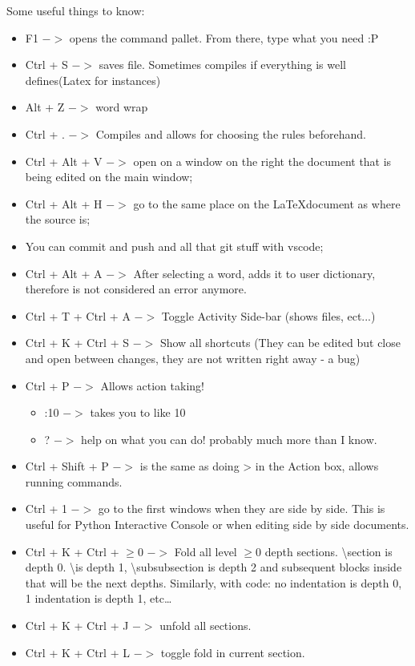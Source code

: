\par Some useful things to know:
\begin{itemize}
    \item F1 $->$ opens the command pallet. From there, type what you need :P
    \item Ctrl + S $->$ saves file. Sometimes compiles if everything is well defines(Latex for instances)
    \item Alt + Z $->$ word wrap
    \item Ctrl + . $->$ Compiles and allows for choosing the rules beforehand.
    \item Ctrl + Alt + V $->$ open on a window on the right the document that is being edited on the main window;
    \item Ctrl + Alt + H $->$ go to the same place on the \LaTeX document as where the source is;
    \item You can commit and push and all that git stuff with vscode;
    \item Ctrl + Alt + A $->$ After selecting a word, adds it to user dictionary, therefore is not considered an error anymore.
    \item Ctrl + T + Ctrl + A $->$ Toggle Activity Side-bar (shows files, ect...)
    \item Ctrl + K + Ctrl + S $->$ Show all shortcuts (They can be edited but close and open between changes, they are not written right away - a bug)
    \item Ctrl + P $->$ Allows action taking! 
        \begin{itemize}
            \item :10 $->$ takes you to like 10
            \item ? $->$ help on what you can do! probably much more than I know.
        \end{itemize}
    \item Ctrl + Shift + P $->$ is the same as doing > in the Action box, allows running commands.
    \item Ctrl + 1 $->$ go to the first windows when they are side by side. This is useful for Python Interactive Console or when editing side by side documents.
    \item Ctrl + K + Ctrl + $\geq 0$ $->$ Fold all level $\geq 0$ depth sections. \textbackslash section is depth 0. \textbackslash  is depth 1, \textbackslash subsubsection is depth 2 and subsequent blocks inside that will be the next depths. Similarly, with code: no indentation is depth 0, 1 indentation is depth 1, etc\dots
    \item Ctrl + K + Ctrl + J $->$ unfold all sections.
    \item Ctrl + K + Ctrl + L $->$ toggle fold in current section.
\end{itemize}

